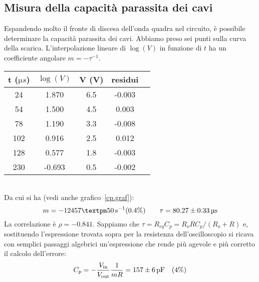 \documentclass[italian,a4paper]{article}
\begin{document}
\subsection{Misura della capacità parassita dei cavi}
Espandendo molto il fronte di discesa dell'onda quadra nel circuito, è possibile determinare la capacità parassita dei cavi. Abbiamo preso sei punti sulla curva della scarica. L'interpolazione lineare di $\log(V)$ in funzione di $t$ ha un coefficiente angolare $m = -\tau^{-1}$.
\begin{table}[h]
\centering
 \begin{tabular}{*5c}
 t ($\unit{\micro s}$) &$\log(V) $&V (\unit{V}) & residui \\\hline
24 &1.870 &6.5 &-0.003\\
54 &1.500 &4.5 &0.003\\
78 &1.190 &3.3 &-0.008\\
102 &0.916 &2.5 &0.012\\
128 &0.577 &1.8 &-0.003\\
230 &-0.693 &0.5 &-0.002\\
 \end{tabular}
\end{table}\\
Da cui si ha (vedi anche grafico~\ref{cp.graf}):
\begin{equation*}
m =  \unit[-12457 ± 50]{s^{-1}} (0.4\%) \qquad \tau = \unit[80.27\pm0.33]{\micro s}
\end{equation*}
La correlazione è $\rho = -0.841$. Sappiamo che $\tau = R_{eq}C_p = R_oRC_p/(R_o+R)$ e, sostituendo l'espressione trovata sopra per la resistenza dell'oscilloscopio si ricava con semplici passaggi algebrici un'espressione che rende più agevole e più corretto il calcolo dell'errore:
\begin{equation*}
 C_p = -\dfrac{V_\text{in}}{V_\text{out}}\dfrac{1}{mR} = \unit[157\pm6]{pF} \quad (4\%)
\end{equation*}
\end{document}
